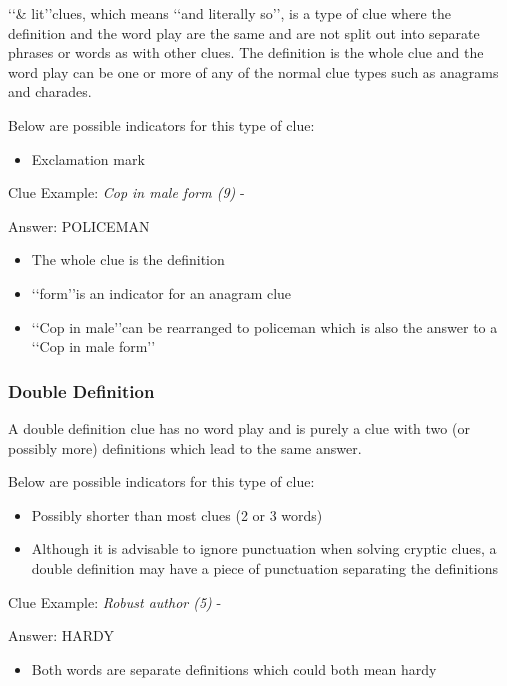 \lq\lq \& lit\rq\rq clues, which means \lq\lq and literally so\rq\rq, is a type of clue where the definition and the word play are the same and are not split out into separate phrases or words as with other clues. The definition is the whole clue and the word play can be one or more of any of the normal clue types such as anagrams and charades. 

Below are possible indicators for this type of clue:
\begin{itemize} 
	\item Exclamation mark
\\
\end{itemize}

Clue Example: \emph{Cop in male form (9)}   - \citep{shuchiLit08} 

Answer: POLICEMAN 

\begin{itemize}
	\item The whole clue is the definition 
	\item \lq\lq form\rq\rq is an indicator for an anagram clue 
	\item \lq\lq Cop in male\rq\rq can be rearranged to policeman which is also the answer to a \lq\lq Cop in male form\rq\rq 
\end{itemize}

\subsubsection{Double Definition}

A double definition clue has no word play and is purely a clue with two (or possibly more) definitions which lead to the same answer. 

Below are possible indicators for this type of clue:
\begin{itemize} 
	\item Possibly shorter than most clues (2 or 3 words) 
	\item Although it is advisable to ignore punctuation when solving cryptic clues, a double definition may have a piece of punctuation separating the definitions 
\\
\end{itemize}

Clue Example: \emph{Robust author (5)}  - \citep{shuchiDouble08}

Answer: HARDY 

\begin{itemize}
	\item Both words are separate definitions which could both mean hardy 
\end{itemize}

